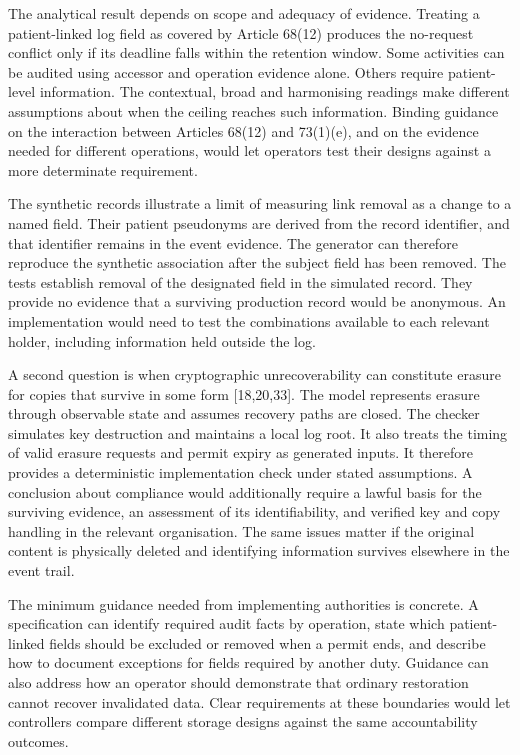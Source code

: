 \documentclass[5p,twocolumn]{elsarticle}
\begin{document}
The analytical result depends on scope and adequacy of evidence.
Treating a patient-linked log field as covered by Article 68(12)
produces the no-request conflict only if its deadline falls within the
retention window. Some activities can be audited using accessor and
operation evidence alone. Others require patient-level information. The
contextual, broad and harmonising readings make different assumptions
about when the ceiling reaches such information. Binding guidance on the
interaction between Articles 68(12) and 73(1)(e), and on the evidence
needed for different operations, would let operators test their designs
against a more determinate requirement.

The synthetic records illustrate a limit of measuring link removal as a
change to a named field. Their patient pseudonyms are derived from the
record identifier, and that identifier remains in the event evidence.
The generator can therefore reproduce the synthetic association after
the subject field has been removed. The tests establish removal of the
designated field in the simulated record. They provide no evidence that
a surviving production record would be anonymous. An implementation
would need to test the combinations available to each relevant holder,
including information held outside the log.

A second question is when cryptographic unrecoverability can constitute
erasure for copies that survive in some form {[}18,20,33{]}. The model
represents erasure through observable state and assumes recovery paths
are closed. The checker simulates key destruction and maintains a local
log root. It also treats the timing of valid erasure requests and permit
expiry as generated inputs. It therefore provides a deterministic
implementation check under stated assumptions. A conclusion about
compliance would additionally require a lawful basis for the surviving
evidence, an assessment of its identifiability, and verified key and
copy handling in the relevant organisation. The same issues matter if
the original content is physically deleted and identifying information
survives elsewhere in the event trail.

The minimum guidance needed from implementing authorities is concrete. A
specification can identify required audit facts by operation, state
which patient-linked fields should be excluded or removed when a permit
ends, and describe how to document exceptions for fields required by
another duty. Guidance can also address how an operator should
demonstrate that ordinary restoration cannot recover invalidated data.
Clear requirements at these boundaries would let controllers compare
different storage designs against the same accountability outcomes.
\end{document}

